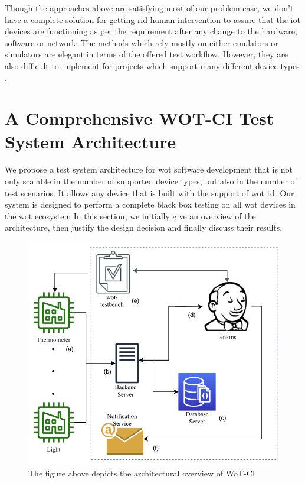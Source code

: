 \documentclass[conference]{IEEEtran}
\theoremstyle{definition}
\begin{document}
Though the approaches above are satisfying most of our problem case, we don’t have a complete solution for getting rid human intervention to assure that the \ac{iot} devices are functioning as per the requirement after any change to the hardware, software or network. 
The methods which rely mostly on either emulators or simulators are elegant in terms of the offered test workflow. 
However, they are also difficult to implement for projects which support many different device types \cite{rosenkranz2015distributed}.

\section{A Comprehensive WOT-CI Test System Architecture}

We propose a test system architecture for \ac{wot} software development that is not only scalable in the number of supported device types, but also in the number of test scenarios. 
It allows any device that is built with the support of \ac{wot} \ac{td}.  
Our system is designed to perform a complete black box testing on all \ac{wot} devices in the \ac{wot} ecosystem
In this section, we initially give an overview of the architecture, then justify the design decision and finally discuss their results.

\begin{figure}[t]
  \centerline{\includegraphics[scale=0.7]{arch} }
  \caption{The figure above depicts the architectural overview of WoT-CI}
  \label{fig:Architecture}
\end{figure}
\end{document}
